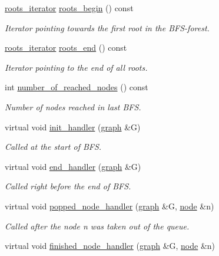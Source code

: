\begin{DoxyCompactItemize}
\mbox{\hyperlink{classbfs_a386ac6f3c63e38c3f5263e15c3ab9d01}{roots\+\_\+iterator}} \mbox{\hyperlink{classbfs_a45d58d06d0dcd6427edad2ec52a6ebb9}{roots\+\_\+begin}} () const
\begin{DoxyCompactList}\small\item\em Iterator pointing towards the first root in the B\+F\+S-\/forest. \end{DoxyCompactList}\item 
\mbox{\hyperlink{classbfs_a386ac6f3c63e38c3f5263e15c3ab9d01}{roots\+\_\+iterator}} \mbox{\hyperlink{classbfs_ac84b90f777adeb90390689db62602d73}{roots\+\_\+end}} () const
\begin{DoxyCompactList}\small\item\em Iterator pointing to the end of all roots. \end{DoxyCompactList}\item 
int \mbox{\hyperlink{classbfs_abb971551139ed87e6c78062275301c1b}{number\+\_\+of\+\_\+reached\+\_\+nodes}} () const
\begin{DoxyCompactList}\small\item\em Number of nodes reached in last B\+FS. \end{DoxyCompactList}\item 
virtual void \mbox{\hyperlink{classbfs_ab9af608a9b2d570a8688498bc3c53d7f}{init\+\_\+handler}} (\mbox{\hyperlink{classgraph}{graph}} \&G)
\begin{DoxyCompactList}\small\item\em Called at the start of B\+FS. \end{DoxyCompactList}\item 
virtual void \mbox{\hyperlink{classbfs_ad99b9aeb177a8a2e0ce1c3673082cddf}{end\+\_\+handler}} (\mbox{\hyperlink{classgraph}{graph}} \&G)
\begin{DoxyCompactList}\small\item\em Called right before the end of B\+FS. \end{DoxyCompactList}\item 
virtual void \mbox{\hyperlink{classbfs_a3f161fe9f45e0a69892f355a889c3516}{popped\+\_\+node\+\_\+handler}} (\mbox{\hyperlink{classgraph}{graph}} \&G, \mbox{\hyperlink{classnode}{node}} \&n)
\begin{DoxyCompactList}\small\item\em Called after the node {\itshape n} was taken out of the queue. \end{DoxyCompactList}\item 
virtual void \mbox{\hyperlink{classbfs_adb6604080f3376e9713e35cd9d7d8943}{finished\+\_\+node\+\_\+handler}} (\mbox{\hyperlink{classgraph}{graph}} \&G, \mbox{\hyperlink{classnode}{node}} \&n)

\end{DoxyCompactItemize}
